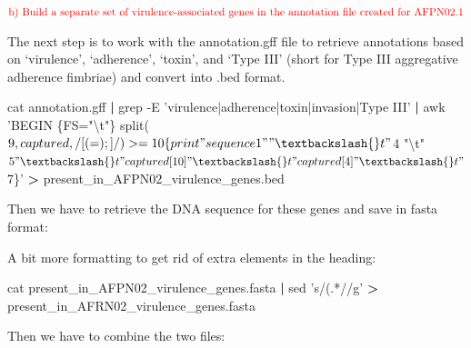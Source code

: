 \documentclass[]{article}
\newenvironment{Shaded}{\begin{snugshade}}{\end{snugshade}}
\newcommand{\KeywordTok}[1]{\textcolor[rgb]{0.13,0.29,0.53}{\textbf{#1}}}
\newcommand{\StringTok}[1]{\textcolor[rgb]{0.31,0.60,0.02}{#1}}
\newcommand{\FunctionTok}[1]{\textcolor[rgb]{0.00,0.00,0.00}{#1}}
\newcommand{\VariableTok}[1]{\textcolor[rgb]{0.00,0.00,0.00}{#1}}
\newcommand{\OperatorTok}[1]{\textcolor[rgb]{0.81,0.36,0.00}{\textbf{#1}}}
\newcommand{\ExtensionTok}[1]{#1}
\newcommand{\NormalTok}[1]{#1}
\begin{document}
\(\color{red}{\text{b) Build a separate set of virulence-associated genes in the annotation file created for AFPN02.1}}\)

The next step is to work with the annotation.gff file to retrieve
annotations based on `virulence', `adherence', `toxin', and `Type III'
(short for Type III aggregative adherence fimbriae) and convert into
.bed format.

\begin{Shaded}
\begin{Highlighting}[]
\FunctionTok{cat}\NormalTok{ annotation.gff }\KeywordTok{|} \FunctionTok{grep}\NormalTok{ -E }\StringTok{'virulence|adherence|toxin|invasion|Type III'} \KeywordTok{|} \FunctionTok{awk} \StringTok{'BEGIN \{FS="\textbackslash{}t"\}  split($9, captured, /[(=);]/) >=10  \{print "sequence1" "\textbackslash{}t" $4 "\textbackslash{}t" $5 "\textbackslash{}t" captured[10] "\textbackslash{}t" captured[4] "\textbackslash{}t" $7\}'} \OperatorTok{>}\NormalTok{ present_in_AFPN02_virulence_genes.bed}
\end{Highlighting}
\end{Shaded}

Then we have to retrieve the DNA sequence for these genes and save in
fasta format:

\begin{Shaded}
\end{Shaded}

A bit more formatting to get rid of extra elements in the heading:

\begin{Shaded}
\begin{Highlighting}[]
\FunctionTok{cat}\NormalTok{ present_in_AFPN02_virulence_genes.fasta }\KeywordTok{|} \FunctionTok{sed} \StringTok{'s/(.*//g'} \OperatorTok{>}\NormalTok{ present_in_AFRN02_virulence_genes.fasta}
\end{Highlighting}
\end{Shaded}

Then we have to combine the two files:

\begin{Shaded}
\end{Shaded}
\end{document}

